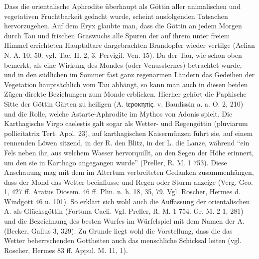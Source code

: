 \documentclass[a4paper, 11pt, oneside]{article}
\begin{document}
Dass die orientalische Aphrodite überhaupt als Göttin aller animalischen und vegetativen Fruchtbarkeit gedacht wurde, scheint ausfolgenden Tatsachen hervorzugehen. Auf dem Eryx glaubte man, dass die Göttin an jedem Morgen durch Tau und frischen Graswuchs alle Spuren der auf ihrem unter freiem Himmel errichteten Hauptaltare dargebrachten Brandopfer wieder vertilge (Aelian N. A. 10, 50. vgl. Tac. H. 2, 3. Pervigil. Ven. 15). Da der Tau, wie schon oben bemerkt, als eine Wirkung des Mondes (oder Venussternes) betrachtet wurde, und in den südlichen im Sommer fast ganz regenarmen Ländern das Gedeihen der Vegetation hauptsächlich vom Tau abhängt, so kann man auch in diesen beiden Zügen direkte Beziehungen zum Monde erblicken. Hierher gehört die Paphische Sitte der Göttin Gärten zu heiligen (Α. ἱεροκηπίς. v. Baudissin a. a. O. 2, 210) und die Rolle, welche Astarte-Aphrodite im Mythos von Adonis spielt. Die Karthagische Virgo caelestis galt sogar als Wetter- und Regengöttin (pluviarum pollicitatrix Tert. Apol. 23), auf karthagischen Kaisermünzen führt sie, auf einem rennenden Löwen sitzend, in der R. den Blitz, in der L. die Lanze, während "`ein Fels neben ihr, aus welchem Wasser hervorquillt, an den Segen der Höhe erinnert, um den sie in Karthago angegangen wurde"' (Preller, R. M. 1 753). Diese Anschauung mag mit dem im Altertum verbreiteten Gedanken zusammenhängen, dass der Mond das Wetter beeinflusse und Regen oder Sturm anzeige (Verg. Geo. 1, 427 ff. Aratus Diosem. 46 ff. Plin. n. h. 18, 35, 79. Vgl. Roscher, Hermes d. Windgott 46 u. 101). So erklärt sich wohl auch die Auffassung der orientalischen A. als Glücksgöttin (Fortuna Caeli. Vgl. Preller, R. M. 1 754. Gr. M. 2 1, 281) und die Bezeichnung des besten Wurfes im Würfelspiel mit dem Namen der A. (Becker, Gallus 3, 329). Zu Grunde liegt wohl die Vorstellung, dass die das Wetter beherrschenden Gottheiten auch das menschliche Schicksal leiten (vgl. Roscher, Hermes 83 ff. Appul. M. 11, 1).
\end{document}

